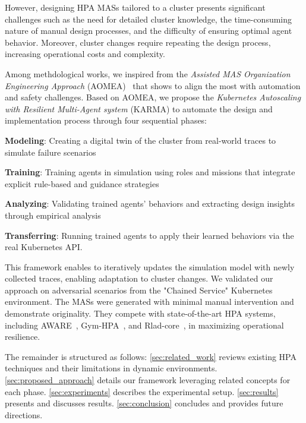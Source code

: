 \documentclass[conference]{IEEEtran}
\begin{document}
However, designing HPA MASs tailored to a cluster presents significant challenges such as the need for detailed cluster knowledge, the time-consuming nature of manual design processes, and the difficulty of ensuring optimal agent behavior. Moreover, cluster changes require repeating the design process, increasing operational costs and complexity.

Among methdological works, we inspired from the \textit{Assisted MAS Organization Engineering Approach} (AOMEA)~\cite{soule2024aomea} that shows to align the most with automation and safety challenges. Based on AOMEA, we propose the \textit{Kubernetes Autoscaling with Resilient Multi-Agent system} (KARMA) to automate the design and implementation process through four sequential phases:
\begin{enumerate*}[label=\textbf{\arabic*)}, itemjoin={;\quad }]
    \item \textbf{Modeling}: Creating a digital twin of the cluster from real-world traces to simulate failure scenarios
    \item \textbf{Training}: Training agents in simulation using roles and missions that integrate explicit rule-based and guidance strategies
    \item \textbf{Analyzing}: Validating trained agents' behaviors and extracting design insights through empirical analysis
    \item \textbf{Transferring}: Running trained agents to apply their learned behaviors via the real Kubernetes API.
\end{enumerate*}

This framework enables to iteratively updates the simulation model with newly collected traces, enabling adaptation to cluster changes. We validated our approach on adversarial scenarios from the "Chained Service" Kubernetes environment. The MASs were generated with minimal manual intervention and demonstrate originality. They compete with state-of-the-art HPA systems, including AWARE~\cite{aware2023}, Gym-HPA~\cite{gymhpa2022}, and Rlad-core~\cite{Rossi2019}, in maximizing operational resilience.

The remainder is structured as follows:
\autoref{sec:related_work} reviews existing HPA techniques and their limitations in dynamic environments.
\autoref{sec:proposed_approach} details our framework leveraging related concepts for each phase.
\autoref{sec:experiments} describes the experimental setup.
\autoref{sec:results} presents and discusses results.
\autoref{sec:conclusion} concludes and provides future directions.
\end{document}
